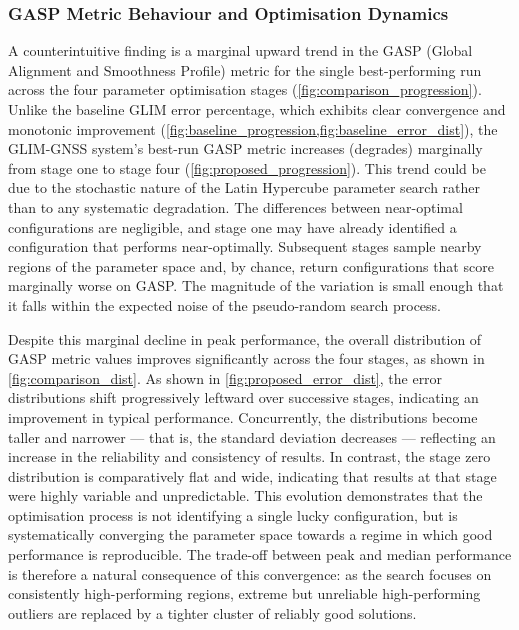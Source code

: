 \subsubsection{GASP Metric Behaviour and Optimisation Dynamics}

A counterintuitive finding is a marginal upward trend in the GASP (Global Alignment and Smoothness Profile) metric for the single best-performing run across the four parameter optimisation stages (\cref{fig:comparison_progression}). Unlike the baseline GLIM error percentage, which exhibits clear convergence and monotonic improvement (\cref{fig:baseline_progression,fig:baseline_error_dist}), the GLIM-GNSS system's best-run GASP metric increases (degrades) marginally from stage one to stage four (\cref{fig:proposed_progression}). This trend could be due to the stochastic nature of the Latin Hypercube parameter search rather than to any systematic degradation. The differences between near-optimal configurations are negligible, and stage one may have already identified a configuration that performs near-optimally. Subsequent stages sample nearby regions of the parameter space and, by chance, return configurations that score marginally worse on GASP. The magnitude of the variation is small enough that it falls within the expected noise of the pseudo-random search process.

Despite this marginal decline in peak performance, the overall distribution of GASP metric values improves significantly across the four stages, as shown in \cref{fig:comparison_dist}. As shown in \cref{fig:proposed_error_dist}, the error distributions shift progressively leftward over successive stages, indicating an improvement in typical performance. Concurrently, the distributions become taller and narrower — that is, the standard deviation decreases — reflecting an increase in the reliability and consistency of results. In contrast, the stage zero distribution is comparatively flat and wide, indicating that results at that stage were highly variable and unpredictable. This evolution demonstrates that the optimisation process is not identifying a single lucky configuration, but is systematically converging the parameter space towards a regime in which good performance is reproducible. The trade-off between peak and median performance is therefore a natural consequence of this convergence: as the search focuses on consistently high-performing regions, extreme but unreliable high-performing outliers are replaced by a tighter cluster of reliably good solutions.

